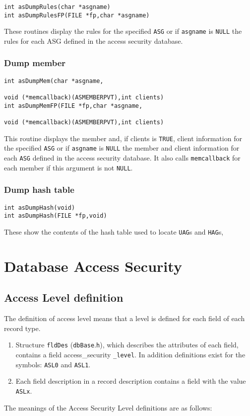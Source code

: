 \begin{verbatim}int asDumpRules(char *asgname)
int asDumpRulesFP(FILE *fp,char *asgname)
\end{verbatim}
These routines display the rules for the specified \verb|ASG| or if \verb|asgname| is \verb|NULL| the rules for each ASG defined in the 
access security database.

\subsubsection{Dump member}

\begin{verbatim}int asDumpMem(char *asgname,

void (*memcallback)(ASMEMBERPVT),int clients)
int asDumpMemFP(FILE *fp,char *asgname,

void (*memcallback)(ASMEMBERPVT),int clients)
\end{verbatim}
This routine displays the member and, if clients is \verb|TRUE|, client information for the specified \verb|ASG| or if \verb|asgname| is \verb|NULL| 
the member and client information for each \verb|ASG| defined in the access security database. It also calls \verb|memcallback| for 
each member if this argument is not \verb|NULL|.

\subsubsection{Dump hash table}

\begin{verbatim}int asDumpHash(void)
int asDumpHash(FILE *fp,void)
\end{verbatim}
These show the contents of the hash table used to locate \verb|UAG|s and \verb|HAG|s,

\section{Database Access Security}

\subsection{Access Level definition}

The definition of access level means that a level is defined for each field of each record type.

\begin{enumerate}\item Structure \verb|fldDes| (\verb|dbBase|.\verb|h|), which describes the attributes of each field, contains a field access\_security 
\verb|_level|. In addition definitions exist for the symbols: \verb|ASL0| and \verb|ASL1|.

\item Each field description in a record description contains a field with the value \verb|ASLx|.

\end{enumerate}The meanings of the Access Security Level definitions are as follows:

